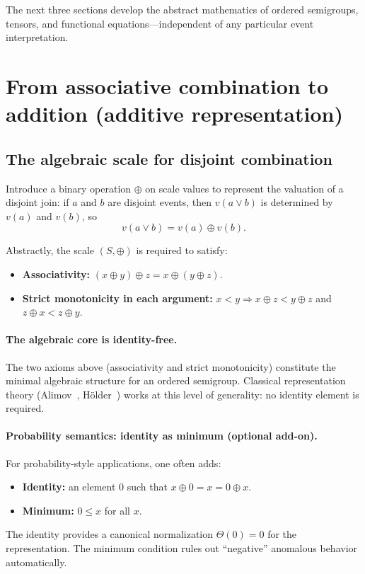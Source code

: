 \documentclass[11pt]{article}
\theoremstyle{definition}
\theoremstyle{remark}
\begin{document}
\noindent
The next three sections develop the abstract mathematics of ordered semigroups, tensors, and
functional equations---independent of any particular event interpretation.

\section{From associative combination to addition (additive representation)}
\label{sec:additive_rep}

\subsection{The algebraic scale for disjoint combination}

Introduce a binary operation $\oplus$ on scale values to represent the valuation of a disjoint join:
if $a$ and $b$ are disjoint events, then $v(a \vee b)$ is determined by $v(a)$ and $v(b)$, so
\[
v(a \vee b) = v(a) \oplus v(b).
\]

Abstractly, the scale $(S,\oplus)$ is required to satisfy:
\begin{itemize}
\item \textbf{Associativity:} $(x \oplus y)\oplus z = x \oplus (y \oplus z)$.
\item \textbf{Strict monotonicity in each argument:} $x<y \Rightarrow x\oplus z < y\oplus z$ and
  $z\oplus x < z\oplus y$.
\end{itemize}

\paragraph{The algebraic core is identity-free.}
The two axioms above (associativity and strict monotonicity) constitute the minimal
algebraic structure for an ordered semigroup.  Classical representation theory
(Alimov~\cite{Alimov1950}, H\"older~\cite{Holder1901}) works at this level of generality:
no identity element is required.

\paragraph{Probability semantics: identity as minimum (optional add-on).}
For probability-style applications, one often adds:
\begin{itemize}
\item \textbf{Identity:} an element $0$ such that $x\oplus 0 = x = 0\oplus x$.
\item \textbf{Minimum:} $0 \le x$ for all $x$.
\end{itemize}
The identity provides a canonical normalization $\Theta(0)=0$ for the representation.
The minimum condition rules out ``negative'' anomalous behavior automatically.
\end{document}
